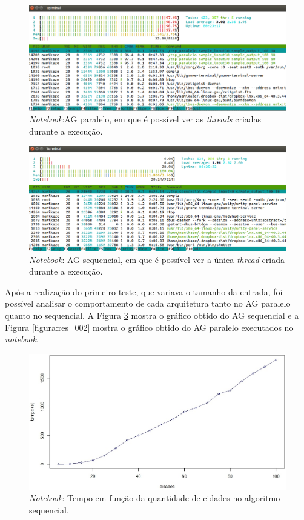 \begin{figure}[htb]  
	\centering
	\includegraphics[width=.9\textwidth]{figuras/res_015}
	\caption[\textit{Notebook}:AG paralelo]{\textit{Notebook}:AG paralelo, em que é possível ver as \textit{threads} criadas durante a execução.}
	\label{figura:res_015}
\end{figure}

\begin{figure}[htb]  
	\centering
	\includegraphics[width=.9\textwidth]{figuras/res_016}
	\caption[\textit{Notebook}: AG sequencia]{\textit{Notebook}: AG sequencial, em que é possível ver a única \textit{thread} criada durante a execução.}
	\label{figura:res_016}
\end{figure}


Após a realização do primeiro teste, que variava o tamanho da entrada, foi possível analisar o comportamento de cada arquitetura tanto no AG paralelo quanto no sequencial. A Figura \ref{figura:res_001} mostra o gráfico obtido do AG sequencial e a  Figura \ref{figura:res_002} mostra o gráfico obtido do AG paralelo executados no \textit{notebook}.

\begin{figure}[htb]  
	\centering
	\includegraphics[width=.69\textwidth]{figuras/res_001_20nts}
	\caption[\textit{Notebook}: tempo sequencial]{\textit{Notebook}: Tempo em função da quantidade de cidades no algoritmo sequencial.}
	\label{figura:res_001}
\end{figure}

